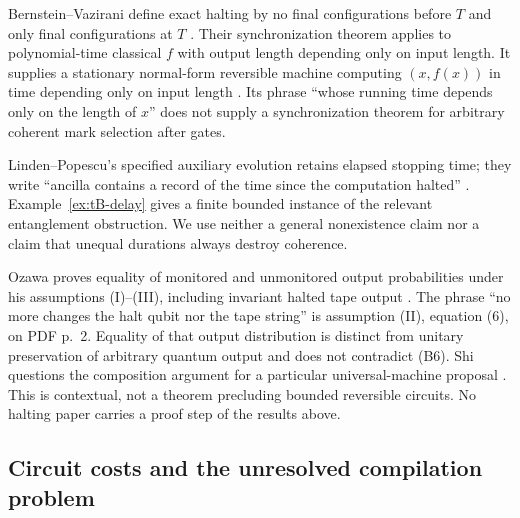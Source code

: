 \begin{remark}\label{rem:tB-halting}
Bernstein--Vazirani define exact halting by no final configurations before
$T$ and only final configurations at $T$
\cite[Definition 3.5.1, PDF p.~14]{BernsteinVazirani1997}.
Their synchronization theorem applies to polynomial-time classical
$f$ with output length depending only on input length. It supplies a
stationary normal-form reversible machine computing $(x,f(x))$ in time
depending only on input length
\cite[Theorem 4.1.3, PDF p.~17]{BernsteinVazirani1997}.
Its phrase ``whose running time depends only on the length of $x$''
does not supply a synchronization theorem for arbitrary coherent
mark selection after gates.

Linden--Popescu's specified auxiliary evolution retains elapsed stopping
time; they write ``ancilla contains a record of the time since the
computation halted''
\cite[PDF p.~2, equations (7)--(11) and text after (9)]{LindenPopescu1998}.
Example~\ref{ex:tB-delay} gives a finite bounded instance of the relevant
entanglement obstruction. We use neither a general nonexistence claim
nor a claim that unequal durations always destroy coherence.

Ozawa proves equality of monitored and unmonitored output probabilities
under his assumptions (I)--(III), including invariant halted tape output
\cite[PDF p.~2, equation (11); proof pp.~2--4,
equations (12)--(14) and following]{Ozawa1998}.
The phrase ``no more changes the halt qubit nor the tape string'' is
assumption (II), equation (6), on PDF p.~2. Equality of that output
distribution is distinct from unitary preservation of arbitrary quantum
output and does not contradict (B6).
Shi questions the composition argument for a particular universal-machine
proposal \cite[PDF pp.~7--8, Section 5, equations (12)--(14)]{Shi2002}.
This is contextual, not a theorem precluding bounded reversible circuits.
No halting paper carries a proof step of the results above.
\end{remark}

\subsection{Circuit costs and the unresolved compilation problem}

